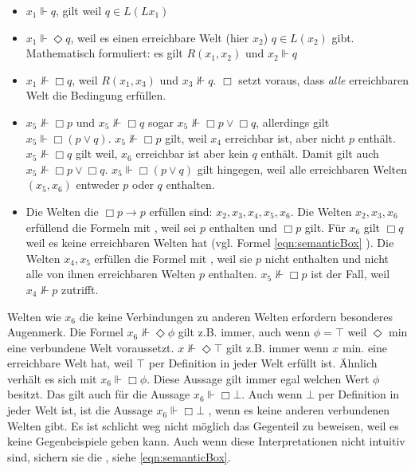 \begin{itemize}
	\item $x_1 \Vdash q$, gilt weil $q \in L(Lx_1)$
	\item $x_1 \Vdash \Diamond q$, weil es einen erreichbare Welt (hier $x_2$) $q \in L(x_2)$ gibt. Mathematisch formuliert: es gilt $R(x_1, x_2)$ und $x_2 \Vdash q$
	\item $x_1 \nVdash \Box q$, weil $R(x_1,x_3)$ und $x_3 \nVdash q$. $\Box$ setzt voraus, dass \emph{alle} erreichbaren Welt die Bedingung erfüllen.
	\item $x_5 \nVdash \Box p$ und $x_5 \nVdash \Box q$ sogar $x_5 \nVdash \Box p \vee \Box q$, allerdings gilt $x_5 \Vdash \Box (p \vee q)$. $x_5 \nVdash \Box p$ gilt, weil $x_4$ erreichbar ist, aber nicht $p$ enthält. $x_5 \nVdash \Box q$ gilt weil, $x_6$ erreichbar ist aber kein $q$ enthält. Damit gilt auch $x_5 \nVdash \Box p \vee \Box q$. $x_5 \Vdash \Box (p \vee q)$ gilt hingegen, weil alle erreichbaren Welten $(x_5, x_6)$ entweder $p$ oder $q$ enthalten.
	\item Die Welten die $\Box p \rightarrow p$ erfüllen sind: $x_2, x_3, x_4, x_5, x_6$.
	Die Welten $x_2, x_3, x_6$ erfüllend die Formeln mit \true, weil sei $p$ enthalten und $\Box p$ gilt. Für $x_6$ gilt $\Box q$ weil es keine erreichbaren Welten hat (vgl. Formel \eqref{eqn:semanticBox} ).
	Die Welten $x_4, x_5$ erfüllen die Formel mit \false, weil sie $p$ nicht enthalten und nicht alle von ihnen erreichbaren Welten $p$ enthalten. $x_5 \nVdash \Box p$ ist der Fall, weil $x_4 \nVdash p$ zutrifft.
\end{itemize}
%
Welten wie $x_6$ die keine Verbindungen zu anderen Welten erfordern besonderes Augenmerk.
Die Formel $x_6 \nVdash \Diamond \phi$ gilt z.B. immer, auch wenn $\phi = \top$ weil $\Diamond$ min eine verbundene Welt voraussetzt.
$x \nVdash \Diamond \top$ gilt z.B. immer wenn $x$ min. eine erreichbare Welt hat, weil $\top$ per Definition in jeder Welt erfüllt ist.
Ähnlich verhält es sich mit $x_6 \Vdash \Box \phi$. Diese Aussage gilt immer egal welchen Wert $\phi$ besitzt.
Das gilt auch für die Aussage $x_6 \Vdash \Box \bot$. 
Auch wenn $\bot$ per Definition in jeder Welt \false ist, ist die Aussage $x_6 \Vdash \Box \bot$ \true, wenn es keine anderen verbundenen Welten gibt.
Es ist schlicht weg nicht möglich das Gegenteil zu beweisen, weil es keine Gegenbeispiele geben kann.
Auch wenn diese Interpretationen nicht intuitiv sind, sichern sie die \deMorganBedingung, siehe \eqref{eqn:semanticBox}.
%
%
